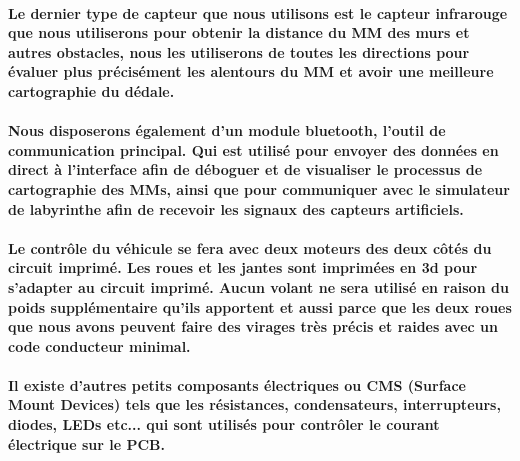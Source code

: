 \paragraph{
	Le dernier type de capteur que nous utilisons est le capteur infrarouge que nous 
utiliserons pour obtenir la distance du MM des murs et autres obstacles, nous les 
utiliserons de toutes les directions pour évaluer plus précisément les alentours 
du MM et avoir une meilleure cartographie du dédale.
}

\paragraph{
	Nous disposerons également d'un module bluetooth, l'outil de communication principal. 
Qui est utilisé pour envoyer des données en direct à l'interface afin de déboguer 
et de visualiser le processus de cartographie des MMs, ainsi que pour communiquer 
avec le simulateur de labyrinthe afin de recevoir les signaux des capteurs artificiels.
}

\paragraph{
	Le contrôle du véhicule se fera avec deux moteurs des deux côtés du circuit imprimé. 
Les roues et les jantes sont imprimées en 3d pour s'adapter au circuit imprimé. Aucun 
volant ne sera utilisé en raison du poids supplémentaire qu'ils apportent et aussi 
parce que les deux roues que nous avons peuvent faire des virages très précis et 
raides avec un code conducteur minimal.
}

\paragraph{
	Il existe d'autres petits composants électriques ou CMS (Surface Mount Devices) 
tels que les résistances, condensateurs, interrupteurs, diodes, LEDs etc... qui sont 
utilisés pour contrôler le courant électrique sur le PCB.
}
